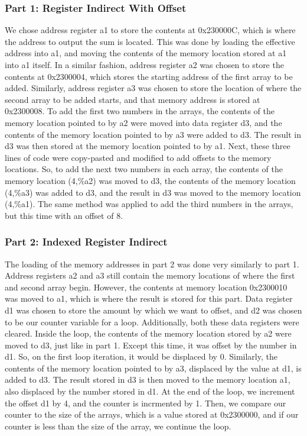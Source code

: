 \documentclass[letterpaper]{article}
\begin{document}
    \subsubsection{Part 1: Register Indirect With Offset}
    We chose address register a1 to store the contents at 0x230000C, which is
    where the address to output the sum is located. This was done by loading the
    effective address into a1, and moving the contents of the memory location
    stored at a1 into a1 itself. In a similar fashion, address register a2 was
    chosen to store the contents at 0x2300004, which stores the starting address
    of the first array to be added. Similarly, address register a3 was chosen to
    store the location of where the second array to be added starts, and that
    memory address is stored at 0x2300008. To add the first two numbers in the
    arrays, the contents of the memory location pointed to by a2 were moved into
    data register d3, and the contents of the memory location pointed to by a3
    were added to d3. The result in d3 was then stored at the memory location
    pointed to by a1. Next, these three lines of code were copy-pasted and
    modified to add offsets to the memory locations.  So, to add the next two
    numbers in each array, the contents of the memory location (4,\%a2) was
    moved to d3, the contents of the memory location (4,\%a3) was added to d3,
    and the result in d3 was moved to the memory location (4,\%a1). The same
    method was applied to add the third numbers in the arrays, but this time
    with an offset of 8.


    \subsubsection{Part 2: Indexed Register Indirect}
    The loading of the memory addresses in part 2 was done very similarly to part 1.
    Address registers a2 and a3 still contain the memory locations of where the
    first and second array begin. However, the contents at memory location
    0x2300010 was moved to a1, which is where the result is stored for this
    part. Data register d1 was chosen to store the amount by which we want to
    offset, and d2 was chosen to be our counter variable for a loop.
    Additionally, both these data registers were cleared. Inside the loop, the
    contents of the memory location stored by a2 were moved to d3, just like in
    part 1. Except this time, it was offset by the number in d1. So, on the
    first loop iteration, it would be displaced by 0. Similarly, the contents of
    the memory location pointed to by a3, displaced by the value at d1, is added
    to d3. The result stored in d3 is then moved to the memory location a1, also
    displaced by the number stored in d1. At the end of the loop, we increment
    the offset d1 by 4, and the counter is incrmented by 1. Then, we compare our
    counter to the size of the arrays, which is a value stored at 0x2300000, and
    if our counter is less than the size of the array, we continue the loop.
\end{document}
